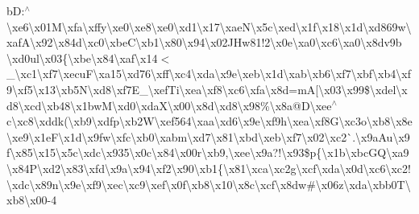 b\+D\+:$^\wedge$\textbackslash{}xe6\textbackslash{}x01\+M\textbackslash{}xfa\textbackslash{}xffy\textbackslash{}xe0\textbackslash{}xe8\textbackslash{}xe0\textbackslash{}xd1\textbackslash{}x17\textbackslash{}xae\+N\textbackslash{}x5c\textbackslash{}xed\textbackslash{}x1f\textbackslash{}x18\textbackslash{}x1d\textbackslash{}xd869w\textbackslash{}xaf\+A\textbackslash{}x92\textbackslash{}x84d\textbackslash{}xc0\textbackslash{}xbe\+C\textbackslash{}xb1\textbackslash{}x80\textbackslash{}x94\textbackslash{}x02\+J\+Hw81!2\textbackslash{}x0e\textbackslash{}xa0\textbackslash{}xc6\textbackslash{}xa0\textbackslash{}x8dv9b \textbackslash{}xd0ul\textbackslash{}x03\{\textbackslash{}xbe\textbackslash{}x84\textbackslash{}xaf\textbackslash{}x14$<$\+\_\+\textbackslash{}xc1\textbackslash{}xf7\textbackslash{}xecu\+F\textbackslash{}xa15\textbackslash{}xd76\textbackslash{}xff\textbackslash{}xc4\textbackslash{}xda\textbackslash{}x9e\textbackslash{}xeb\textbackslash{}x1d\textbackslash{}xab\textbackslash{}xb6\textbackslash{}xf7\textbackslash{}xbf\textbackslash{}xb4\textbackslash{}xf9\textbackslash{}xf5\textbackslash{}x13\textbackslash{}xb5\+N\textbackslash{}xd8\textbackslash{}xf7\+E\+\_\+\textbackslash{}xef\+Ti\textbackslash{}xea\textbackslash{}xf8\textbackslash{}xc6\textbackslash{}xfa\textbackslash{}x8d=m\+A\mbox{[}\textbackslash{}x03\textbackslash{}x99\$\textbackslash{}xdel\textbackslash{}xd8\textbackslash{}xcd\textbackslash{}xb48\textbackslash{}x1bw\+M\textbackslash{}xd0\textbackslash{}xda\+X\textbackslash{}x00\textbackslash{}x8d\textbackslash{}xd8\textbackslash{}x98\%\textbackslash{}x8a@\+D\textbackslash{}xee$^\wedge$c\textbackslash{}xc8\textbackslash{}xddk(\textbackslash{}xb9\textbackslash{}xdfp\textbackslash{}xb2\+W\textbackslash{}xef564\textbackslash{}xaa\textbackslash{}xd6\textbackslash{}x9e\textbackslash{}xf9h\textbackslash{}xea\textbackslash{}xf8\+G\textbackslash{}xc3o\textbackslash{}xb8\textbackslash{}x8e\textbackslash{}xe9\textbackslash{}x1e\+F\textbackslash{}x1d\textbackslash{}x9fw\textbackslash{}xfc\textbackslash{}xb0\textbackslash{}xabm\textbackslash{}xd7\textbackslash{}x81\textbackslash{}xbd\textbackslash{}xeb\textbackslash{}xf7\textbackslash{}x02\textbackslash{}xc2\`{}.\textbackslash{}x9a\+Au\textbackslash{}x9f\textbackslash{}x85\textbackslash{}x15\textbackslash{}x5c\textbackslash{}xdc\textbackslash{}x935\textbackslash{}x0c\textbackslash{}x84\textbackslash{}x00r\textbackslash{}xb9,\textbackslash{}xee\textbackslash{}x9a?!\textbackslash{}x93\$p\{\textbackslash{}x1b\textbackslash{}xbc\+G\+Q\textbackslash{}xa9\textbackslash{}x84\+P\textbackslash{}xd2\textbackslash{}x83\textquotesingle{}\textbackslash{}xfd\textbackslash{}x9a\textbackslash{}x94\textbackslash{}xf2\textbackslash{}x90\textbackslash{}xb1\{\textbackslash{}x81\textbackslash{}xca\textbackslash{}xc2g\textbackslash{}xcf\textbackslash{}xda\textbackslash{}x0d\textbackslash{}xc6\textbackslash{}xc2!\textbackslash{}xdc\textbackslash{}x89n\textbackslash{}x9e\textbackslash{}xf9\textbackslash{}xec\textbackslash{}xc9\textbackslash{}xef\textbackslash{}x0f\textbackslash{}xb8\textbackslash{}x10\textbackslash{}x8c\textbackslash{}xcf\textbackslash{}x8dw\#\textbackslash{}x06z\textbackslash{}xda\textbackslash{}xbb0\+T\textbackslash{}xb8\textbackslash{}x00-\/4 
